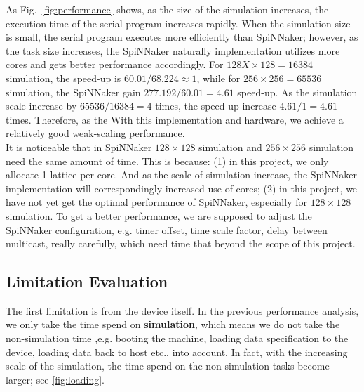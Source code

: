 As Fig.~\ref{fig:performance} shows, as the size of the simulation increases, the execution time of the serial program increases rapidly. When the simulation size is small, the serial program executes more efficiently than SpiNNaker; however, as the task size increases, the SpiNNaker naturally implementation utilizes more cores and gets better performance accordingly. For $128X\times128=16384$ simulation, the speed-up is $60.01/68.224\approx1$, while for $256\times256=65536$ simulation, the SpiNNaker gain $277.192 / 60.01 = 4.61$ speed-up. As the simulation scale increase by $65536 / 16384 = 4$ times, the speed-up increase $4.61 / 1 = 4.61$ times. Therefore, as the With this implementation and hardware, we achieve a relatively good weak-scaling performance.\\

It is noticeable that in SpiNNaker $128\times128$ simulation and $256\times256$ simulation need the same amount of time. This is because: (1) in this project, we only allocate 1 lattice per core. And as the scale of simulation increase, the SpiNNaker implementation will correspondingly increased use of cores; (2) in this project, we have not yet get the optimal performance of SpiNNaker, especially for $128\times128$ simulation. To get a better performance, we are supposed to adjust the SpiNNaker configuration, e.g. timer offset, time scale factor, delay between multicast, really carefully, which need time that beyond the scope of this project.


\subsection{Limitation Evaluation} \label{sec:ana}
The first limitation is from the device itself. In the previous performance analysis, we only take the time spend on \textbf{simulation}, which means we do not take the non-simulation time ,e.g. booting the machine, loading data specification to the device, loading data back to host etc., into account. In fact, with the increasing scale of the simulation, the time spend on the non-simulation tasks become larger; see \ref{fig:loading}.\\

